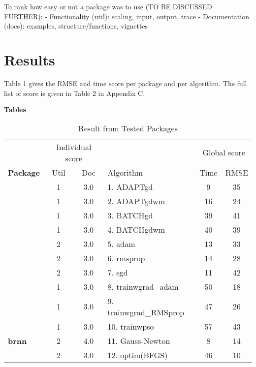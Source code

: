 To rank how easy or not a package was to use (TO BE DISCUSSED FURTHER):
- Functionality (util): scaling, input, output, trace - Documentation
(docs): examples, structure/functions, vignettes

\hypertarget{results}{%
\section{Results}\label{results}}

Table 1 gives the RMSE and time score per package and per algorithm. The
full list of score is given in Table 2 in Appendix C.

\textbf{Tables}

\begin{Schunk}
\begin{table}

\caption{\label{tab:unnamed-chunk-2}Result from Tested Packages}
\centering
\fontsize{7}{9}\selectfont
\begin{tabular}[t]{>{\bfseries}lcclcc}
\toprule
\multicolumn{1}{c}{ } & \multicolumn{2}{c}{Individual score} & \multicolumn{1}{c}{ } & \multicolumn{2}{c}{Global score} \\
\cmidrule(l{3pt}r{3pt}){2-3} \cmidrule(l{3pt}r{3pt}){5-6}
Package & Util & Doc & Algorithm & Time & RMSE\\
\midrule
 & 1 & 3.0 & 1. ADAPTgd & 9 & 35\\

 & 1 & 3.0 & 2. ADAPTgdwm & 16 & 24\\

 & 1 & 3.0 & 3. BATCHgd & 39 & 41\\

\multirow{-4}{*}{\raggedright\arraybackslash AMORE} & 1 & 3.0 & 4. BATCHgdwm & 40 & 39\\
\cmidrule{1-6}
 & 2 & 3.0 & 5. adam & 13 & 33\\

 & 2 & 3.0 & 6. rmsprop & 14 & 28\\

\multirow{-3}{*}{\raggedright\arraybackslash ANN2} & 2 & 3.0 & 7. sgd & 11 & 42\\
\cmidrule{1-6}
 & 1 & 3.0 & 8. trainwgrad\_adam & 50 & 18\\

 & 1 & 3.0 & 9. trainwgrad\_RMSprop & 47 & 26\\

\multirow{-3}{*}{\raggedright\arraybackslash automl} & 1 & 3.0 & 10. trainwpso & 57 & 43\\
\cmidrule{1-6}
brnn & 2 & 4.0 & 11. Gauss-Newton & 8 & 14\\
\cmidrule{1-6}
 & 2 & 3.0 & 12. optim(BFGS) & 46 & 10\\


\end{tabular}
\end{table}
\end{Schunk}
